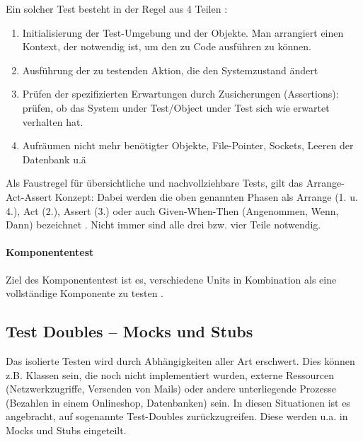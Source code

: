 Ein solcher Test besteht in der Regel aus 4 Teilen \citep{rappin_rails_2011} \citep[Karte 46]{langr_agile_2011}:
\begin{enumerate}
 \item Initialisierung der Test-Umgebung und der Objekte. Man arrangiert einen Kontext, der notwendig ist, um den zu Code ausführen zu können.
 \item Ausführung der zu testenden Aktion, die den Systemzustand ändert
 \item Prüfen der spezifizierten Erwartungen durch Zusicherungen (Assertions): prüfen, ob das System under Test/Object under Test sich wie erwartet verhalten hat.
 \item Aufräumen nicht mehr benötigter Objekte, File-Pointer, Sockets, Leeren der Datenbank u.ä
\end{enumerate}
Als Faustregel für übersichtliche und nachvollziehbare Tests, gilt das Arrange-Act-Assert Konzept: Dabei werden die oben genannten Phasen als Arrange (1. u. 4.), Act (2.), Assert (3.) oder auch Given-When-Then (Angenommen, Wenn, Dann) bezeichnet \citep[Karte 46]{langr_agile_2011}. Nicht immer sind alle drei bzw. vier Teile notwendig.

\paragraph{Komponententest}
Ziel des Komponententest ist es, verschiedene Units in Kombination als eine vollständige Komponente zu testen \citep{goodliffe_code_2006}.

 \subsection{Test Doubles -- Mocks und Stubs}
  \label{sec:mocks}
  Das isolierte Testen wird durch Abhängigkeiten aller Art erschwert. Dies können z.B. Klassen sein, die noch nicht implementiert wurden, externe Ressourcen (Netzwerkzugriffe, Versenden von Mails) oder andere unterliegende Prozesse (Bezahlen in einem Onlineshop, Datenbanken) sein. In diesen Situationen ist es angebracht, auf sogenannte Test-Doubles zurückzugreifen. Diese werden u.a. in Mocks und Stubs eingeteilt.

